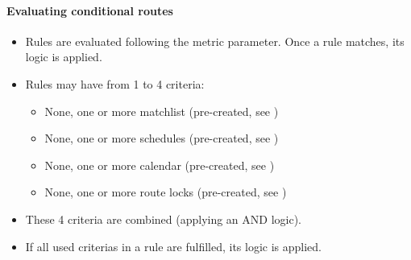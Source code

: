 \documentclass[letterpaper,10pt,spanish]{sphinxmanual}
\begin{document}
\paragraph{Evaluating conditional routes}
\label{administration_portal/client/vpbx/routing_endpoints/conditional_routes:evaluating-conditional-routes}\begin{itemize}
\item {} 
Rules are evaluated following the metric parameter. Once a rule matches, its
logic is applied.

\item {} 
Rules may have from 1 to 4 criteria:
\begin{itemize}
\item {} 
None, one or more matchlist (pre-created, see {\hyperref[administration_portal/client/vpbx/routing_tools/match_lists:match\string-lists]{}})

\item {} 
None, one or more schedules (pre-created, see {\hyperref[administration_portal/client/vpbx/routing_tools/schedules:schedules]{}})

\item {} 
None, one or more calendar (pre-created, see {\hyperref[administration_portal/client/vpbx/routing_tools/calendars:calendars]{}})

\item {} 
None, one or more route locks (pre-created, see {\hyperref[administration_portal/client/vpbx/routing_tools/route_locks:id1]{}})

\end{itemize}

\item {} 
These 4 criteria are combined (applying an AND logic).

\item {} 
If all used criterias in a rule are fulfilled, its logic is applied.

\end{itemize}
\end{document}
